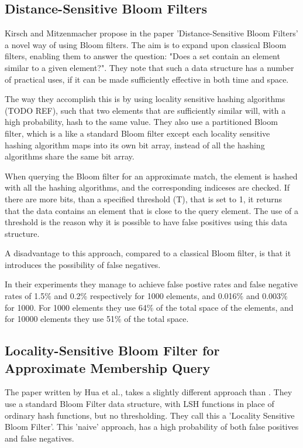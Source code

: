 \documentclass[a4paper,11pt]{article}
\begin{document}
\subsection{Distance-Sensitive Bloom Filters}
Kirsch and Mitzenmacher propose in the paper 'Distance-Sensitive Bloom Filters'\cite{paper:harvard} a novel way of using Bloom filters. The aim is to expand upon classical Bloom filters, enabling them to answer the question: "Does a set contain an element similar to a given element?". They note that such a data structure has a number of practical uses, if it can be made sufficiently effective in both time and space.

The way they accomplish this is by using locality sensitive hashing algorithms (TODO REF), such that two elements that are sufficiently similar will, with a high probability, hash to the same value. They also use a partitioned Bloom filter, which is a like a standard Bloom filter except each locality sensitive hashing algorithm maps into its own bit array, instead of all the hashing algorithms share the same bit array.

When querying the Bloom filter for an approximate match, the element is hashed with all the hashing algorithms, and the corresponding indiceses are checked. If there are more bits, than a specified threshold (T), that is set to 1, it returns that the data contains an element that is close to the query element. The use of a threshold is the reason why it is possible to have false positives using this data structure.

A disadvantage to this approach, compared to a classical Bloom filter, is that it introduces the possibility of false negatives.

In their experiments they manage to achieve false postive rates and false negative rates of 1.5\% and 0.2\% respectively for 1000 elements, and 0.016\% and 0.003\% for 1000. For 1000 elements they use 64\% of the total space of the elements, and for 10000 elements they use 51\% of the total space.



\subsection{Locality-Sensitive Bloom Filter for Approximate Membership Query}
The paper written by Hua et al.\cite{paper:hua}, takes a slightly different approach than \cite{paper:harvard}. They use a standard Bloom Filter data structure, with LSH functions in place of ordinary hash functions, but no thresholding. They call this a 'Locality Sensitive Bloom Filter'. This 'naive' approach, has a high probability of both false positives and false negatives.
\end{document}

